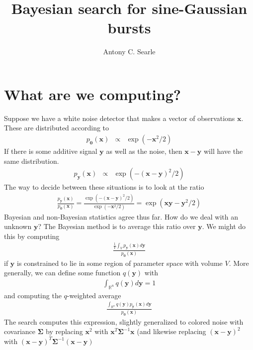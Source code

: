 \documentclass{article}
\begin{document}
\title{Bayesian search for sine-Gaussian bursts}
\author{Antony C. Searle}
\maketitle
\section{What are we computing?}

Suppose we have a white noise detector that makes a vector of observations $\mathbf{x}$.  These are distributed according to
\begin{eqnarray}
p_\mathbf{0}(\mathbf{x})&\propto&\exp(-\mathbf{x}^2/2)
\end{eqnarray}
If there is some additive signal $\mathbf{y}$ as well as the noise, then $\mathbf{x}-\mathbf{y}$ will have the same distribution.
\begin{eqnarray}
p_\mathbf{y}(\mathbf{x})&\propto&\exp(-(\mathbf{x-y})^2/2)
\end{eqnarray}
The way to decide between these situations is to look at the ratio
\begin{eqnarray}
\frac{p_\mathbf{y}(\mathbf{x})}{p_\mathbf{0}(\mathbf{x})}=\frac{\exp(-(\mathbf{x-y})^2/2)}{\exp(-\mathbf{x}^2/2)}=\exp(\mathbf{xy}-\mathbf{y}^2/2)
\end{eqnarray}
Bayesian and non-Bayesian statistics agree thus far.
How do we deal with an unknown $\mathbf{y}$?  The Bayesian method is to average this ratio over $\mathbf{y}$.  We might do this by computing
\begin{eqnarray}
\frac{ \frac{1}{V}\int_V p_\mathbf{y}(\mathbf{x}) d\mathbf{y}}{p_\mathbf{0}(\mathbf{x})}
\end{eqnarray}
if $\mathbf{y}$ is constrained to lie in some region of parameter space with volume $V$.  More generally, we can define some function $q(\mathbf{y})$ with
\begin{eqnarray}
\int_{\mathbb{R}^n} q(\mathbf{y}) d\mathbf{y} = 1
\end{eqnarray}
and computing the $q$-weighted average
\begin{eqnarray}
\frac{ \int_{\mathbb{R}^n} q(\mathbf{y}) p_\mathbf{y}(\mathbf{x}) d\mathbf{y}}{p_\mathbf{0}(\mathbf{x})}
\end{eqnarray}
The search computes this expression, slightly generalized to colored noise with covariance $\mathbf{\Sigma}$ by replacing $\mathbf{x}^2$ with $\mathbf{x}^T\mathbf{\Sigma}^{-1}\mathbf{x}$ (and likewise replacing $(\mathbf{x-y})^2$ with $(\mathbf{x-y})^T\mathbf{\Sigma}^{-1}(\mathbf{x-y})$
\end{document}

